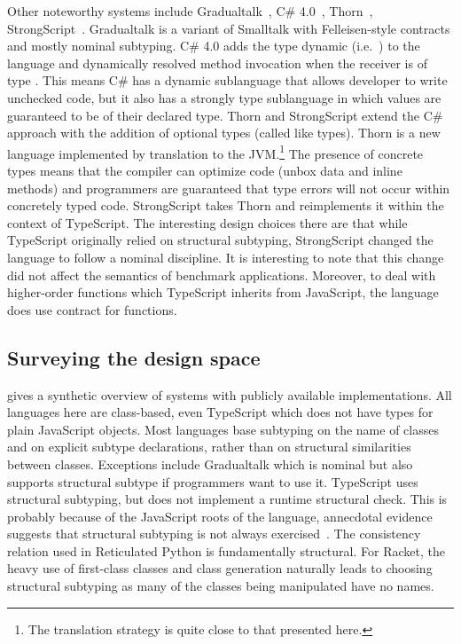\documentclass[a4paper,USenglish]{tex/lipics-v2016}
\begin{document}
Other noteworthy systems include Gradualtalk~\cite{GS13}, C\#
4.0~\cite{Bierman10}, Thorn~\cite{oopsla09},
StrongScript~\cite{ecoop15}. Gradualtalk is a variant of Smalltalk with
Felleisen-style contracts and mostly nominal subtyping. C\# 4.0 adds the
type {\sf dynamic} (i.e.~\any) to the language and dynamically resolved
method invocation when the receiver is of type \any.  This means C\# has a
dynamic sublanguage that allows developer to write unchecked code, but it
also has a strongly type sublanguage in which values are guaranteed to be of
their declared type.  Thorn and StrongScript extend the C\# approach with
the addition of optional types (called like types).  Thorn is a new language
implemented by translation to the JVM.\footnote{The translation strategy is
  quite close to that presented here.} The presence of concrete types means
that the compiler can optimize code (unbox data and inline methods) and
programmers are guaranteed that type errors will not occur within concretely
typed code.  StrongScript takes Thorn and reimplements it within the context
of TypeScript.  The interesting design choices there are that while
TypeScript originally relied on structural subtyping, StrongScript changed
the language to follow a nominal discipline. It is interesting to note that
this change did not affect the semantics of benchmark
applications. Moreover, to deal with higher-order functions which TypeScript
inherits from JavaScript, the language does use contract for functions.


\subsection{Surveying the design space}

 gives a synthetic overview of systems with publicly available
implementations. All languages here are class-based, even TypeScript which
does not have types for plain JavaScript objects. Most languages base
subtyping on the name of classes and on explicit subtype declarations,
rather than on structural similarities between classes.  Exceptions include
Gradualtalk which is nominal but also supports structural subtype if
programmers want to use it.  TypeScript uses structural subtyping, but does
not implement a runtime structural check. This is probably because of the
JavaScript roots of the language, annecdotal evidence suggests that
structural subtyping is not always exercised~\cite{ecoop15}.  The
consistency relation used in Reticulated Python is fundamentally structural.
For Racket, the heavy use of first-class classes and class generation
naturally leads to choosing structural subtyping as many of the classes
being manipulated have no names.
\end{document}

